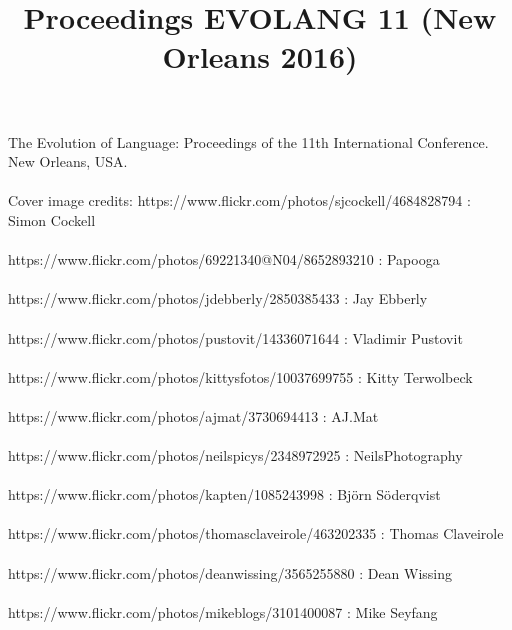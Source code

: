 \documentclass{evolang9_book}
\begin{document}
\title{ \textbf{Proceedings EVOLANG 11 (New Orleans 2016)}}
\author{}



\chapter*{}
The Evolution of Language: Proceedings of the 11th International Conference.  New Orleans, USA.
\\\\
Cover image credits:
https://www.flickr.com/photos/sjcockell/4684828794
 : Simon Cockell
\\\\
https://www.flickr.com/photos/69221340@N04/8652893210
: Papooga
\\\\
https://www.flickr.com/photos/jdebberly/2850385433
: Jay Ebberly
\\\\
https://www.flickr.com/photos/pustovit/14336071644
: Vladimir Pustovit
\\\\
https://www.flickr.com/photos/kittysfotos/10037699755
: Kitty Terwolbeck
\\\\
https://www.flickr.com/photos/ajmat/3730694413
: AJ.Mat
\\\\
https://www.flickr.com/photos/neilspicys/2348972925
: NeilsPhotography
\\\\
https://www.flickr.com/photos/kapten/1085243998
: Bj\"{o}rn S\"{o}derqvist
\\\\
https://www.flickr.com/photos/thomasclaveirole/463202335
: Thomas Claveirole
\\\\
https://www.flickr.com/photos/deanwissing/3565255880
: Dean Wissing
\\\\
https://www.flickr.com/photos/mikeblogs/3101400087
: Mike Seyfang

\end{document}
